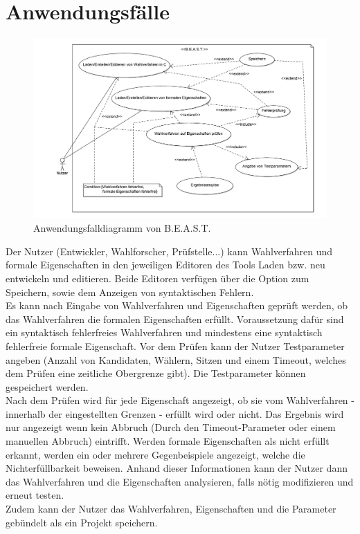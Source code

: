 \documentclass[a4paper]{scrreprt}
\begin{document}
\section{Anwendungsfälle}

\begin{figure}[H]
\hspace{-3cm}
\includegraphics[scale=0.12]{UseCaseDiagram.png}
\caption{Anwendungsfalldiagramm von B.E.A.S.T.}
\label{Packet-scetch}
\end{figure}

Der Nutzer (Entwickler, Wahlforscher, Prüfstelle...) kann Wahlverfahren und formale Eigenschaften in den jeweiligen Editoren des Tools Laden bzw. neu entwickeln und editieren.
Beide Editoren verfügen über die Option zum Speichern, sowie dem Anzeigen von syntaktischen Fehlern.\\
Es kann nach Eingabe von Wahlverfahren und Eigenschaften geprüft werden, ob das Wahlverfahren die formalen Eigenschaften erfüllt. Voraussetzung dafür sind ein syntaktisch fehlerfreies Wahlverfahren und mindestens eine syntaktisch fehlerfreie formale Eigenschaft. Vor dem Prüfen kann der Nutzer Testparameter angeben (Anzahl von Kandidaten, Wählern, Sitzen und einem Timeout, welches dem Prüfen eine zeitliche Obergrenze gibt). Die Testparameter können gespeichert werden.\\
Nach dem Prüfen wird für jede Eigenschaft angezeigt, ob sie vom Wahlverfahren - innerhalb der eingestellten Grenzen - erfüllt wird oder nicht. Das Ergebnis wird nur angezeigt wenn kein Abbruch (Durch den Timeout-Parameter oder einem manuellen Abbruch) eintrifft. Werden formale Eigenschaften als nicht erfüllt erkannt, werden ein oder mehrere Gegenbeispiele angezeigt, welche die Nichterfüllbarkeit beweisen. Anhand dieser Informationen kann der Nutzer dann das Wahlverfahren und die Eigenschaften analysieren, falls nötig modifizieren und erneut testen.\\
Zudem kann der Nutzer das Wahlverfahren, Eigenschaften und die Parameter gebündelt als ein Projekt speichern.
\pagebreak
\end{document}

